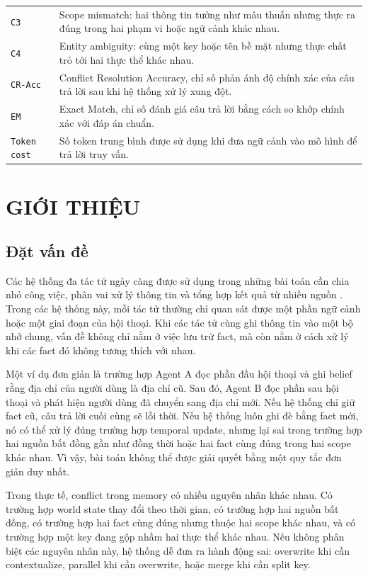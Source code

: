 \documentclass[12pt,a4paper]{article}
\newcommand{\code}[1]{\texttt{#1}}
\begin{document}
\begin{longtable}{p{}p{}}
\code{C3} & Scope mismatch: hai thông tin tưởng như mâu thuẫn nhưng thực ra đúng trong hai phạm vi hoặc ngữ cảnh khác nhau. \\
\code{C4} & Entity ambiguity: cùng một key hoặc tên bề mặt nhưng thực chất trỏ tới hai thực thể khác nhau. \\
\code{CR-Acc} & Conflict Resolution Accuracy, chỉ số phản ánh độ chính xác của câu trả lời sau khi hệ thống xử lý xung đột. \\
\code{EM} & Exact Match, chỉ số đánh giá câu trả lời bằng cách so khớp chính xác với đáp án chuẩn. \\
\code{Token cost} & Số token trung bình được sử dụng khi đưa ngữ cảnh vào mô hình để trả lời truy vấn. \\
\bottomrule
\end{longtable}

\newpage
\pagestyle{plain}

\section{GIỚI THIỆU}

\subsection{Đặt vấn đề}

Các hệ thống đa tác tử ngày càng được sử dụng trong những bài toán cần chia nhỏ công việc, phân vai xử lý thông tin và tổng hợp kết quả từ nhiều nguồn \cite{park2023generative,yao2023react}. Trong các hệ thống này, mỗi tác tử thường chỉ quan sát được một phần ngữ cảnh hoặc một giai đoạn của hội thoại. Khi các tác tử cùng ghi thông tin vào một bộ nhớ chung, vấn đề không chỉ nằm ở việc lưu trữ fact, mà còn nằm ở cách xử lý khi các fact đó không tương thích với nhau.

Một ví dụ đơn giản là trường hợp Agent A đọc phần đầu hội thoại và ghi belief rằng địa chỉ của người dùng là địa chỉ cũ. Sau đó, Agent B đọc phần sau hội thoại và phát hiện người dùng đã chuyển sang địa chỉ mới. Nếu hệ thống chỉ giữ fact cũ, câu trả lời cuối cùng sẽ lỗi thời. Nếu hệ thống luôn ghi đè bằng fact mới, nó có thể xử lý đúng trường hợp temporal update, nhưng lại sai trong trường hợp hai nguồn bất đồng gần như đồng thời hoặc hai fact cùng đúng trong hai scope khác nhau. Vì vậy, bài toán không thể được giải quyết bằng một quy tắc đơn giản duy nhất.

Trong thực tế, conflict trong memory có nhiều nguyên nhân khác nhau. Có trường hợp world state thay đổi theo thời gian, có trường hợp hai nguồn bất đồng, có trường hợp hai fact cùng đúng nhưng thuộc hai scope khác nhau, và có trường hợp một key đang gộp nhầm hai thực thể khác nhau. Nếu không phân biệt các nguyên nhân này, hệ thống dễ đưa ra hành động sai: overwrite khi cần contextualize, parallel khi cần overwrite, hoặc merge khi cần split key.
\end{document}
